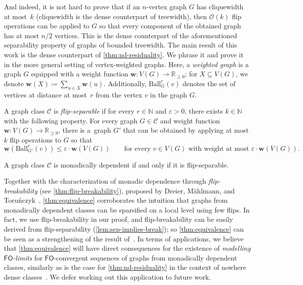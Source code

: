 \documentclass[a4paper,UKenglish,cleveref, autoref, thm-restate]{lipics-v2021}
\newcommand{\eps}{\varepsilon}
\newcommand{\FO}{\mathsf{FO}}
\newcommand{\R}{\mathbb{R}}
\newcommand{\N}[0]{\mathrm{\mathbb{N}}}
\newcommand{\weight}{\mathbf{w}}
\newcommand{\CC}{\mathcal{C}}
\newcommand{\Cc}{\CC}
\renewcommand{\le}{\leqslant}
\renewcommand{\ge}{\geqslant}
\renewcommand{\geq}{\ge}
\newcommand{\Ball}{\mathrm{Ball}}
\newcommand{\Oh}{\mathcal{O}}
\begin{document}
And indeed, it is not hard to prove that if an $n$-vertex graph $G$ has cliquewidth at most~$k$ (cliquewidth is the dense counterpart of treewidth), then $\Oh(k)$ flip operations can be applied to $G$ so that every component of the obtained graph has at most $n/2$ vertices. This is the dense counterpart of the aforementioned separability property of graphs of bounded treewidth. The main result of this work is the dense counterpart of \cref{thm:nd-residuality}. We phrase it and prove it in the more general setting of vertex-weighted graphs. Here, a {\em{weighted graph}} is a graph $G$ equipped with a weight function $\weight\colon V(G)\to \R_{\geq 0}$; for $X\subseteq V(G)$, we denote $\weight(X)\coloneqq \sum_{u\in X} \weight(u)$. 
Additionally, $\Ball^r_G(v)$ denotes the set of vertices at distance at most~$r$ from the vertex $v$ in the graph $G$.



\begin{definition}\label{def:separable}
  A graph class $\CC$
  is \emph{flip-separable}
  if for every $r\in\N$ and $\eps>0$, there exists $k\in\N$ with the following property.
    For every graph $G\in \CC$ and weight function $\weight\colon V(G) \to \R_{\geq 0}$, there is a~graph $G'$ that can be obtained by applying at most $k$ flip operations to $G$ so that
    \[\weight(\Ball^r_{G'}(v))\le \eps\cdot \weight(V(G))\qquad\text{for every $v\in V(G)$ with weight at~most~$\eps\cdot \weight(V(G))$}.\]
\end{definition}

\begin{theorem}\label{thm:equivalence}
  A graph class $\Cc$ is monadically dependent if and only if it is flip-separable.
\end{theorem}

Together with the characterization of monadic dependence through {\em{flip-breakability}} (see \cref{thm:flip-breakability}), proposed by Dreier, M\"ahlmann, and Toru\'nczyk~\cite{flip-breakability}, \cref{thm:equivalence} corroborates the intuition that graphs from monadically dependent classes can be sparsified on a local level using few flips. In fact, we use flip-breakability in our proof, and flip-breakability can be easily derived from flip-separability (\cref{lem:sep-implies-break}); so \cref{thm:equivalence} can be seen as a strengthening of the result of~\cite{flip-breakability}. In terms of applications, we believe that \cref{thm:equivalence} will have direct consequences for the existence of {\em{modelling $\FO$-limits}} for $\FO$-convergent sequences of graphs from monadically dependent classes, similarly as is the case for \cref{thm:nd-residuality} in the context of nowhere dense classes~\cite{modellinglimits}. We defer working out this application to future work.
\end{document}
